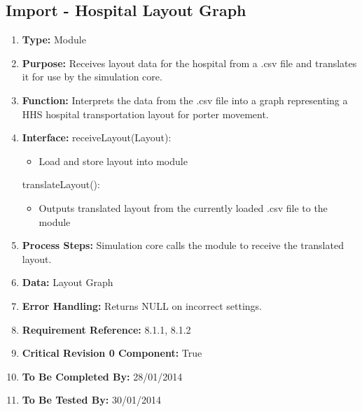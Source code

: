 \documentclass[paper=letter, fontsize=10pt]{scrartcl}
\numberwithin{equation}{section}		%
\numberwithin{figure}{section}			%
\numberwithin{table}{section}				%
\begin{document}
\subsection{Import - Hospital Layout Graph}
\begin{enumerate}[] 
	\item \textbf{Type:} Module
	\item \textbf{Purpose:} Receives layout data for the hospital from a .csv file and translates it for use by the simulation core.
	\item \textbf{Function:} Interprets the data from the .csv file into a graph representing a HHS hospital transportation layout for porter movement.
	\item \textbf{Interface:} \newline
	receiveLayout(Layout):
	 	\begin{itemize}
	 		\item Load and store layout into module
	 	\end{itemize}
	 translateLayout():
	 	\begin{itemize}
	 		\item Outputs translated layout from the currently loaded .csv file to the module
	 	\end{itemize}
	\item \textbf{Process Steps:} Simulation core calls the module to receive the translated layout.
	\item \textbf{Data:} Layout Graph
	\item \textbf{Error Handling:} Returns NULL on incorrect settings.
	\item \textbf{Requirement Reference:} 8.1.1, 8.1.2
	\item \textbf{Critical Revision 0 Component:} True
	\item \textbf{To Be Completed By:} 28/01/2014
	\item \textbf{To Be Tested By:} 30/01/2014
\end{enumerate}
\end{document}
